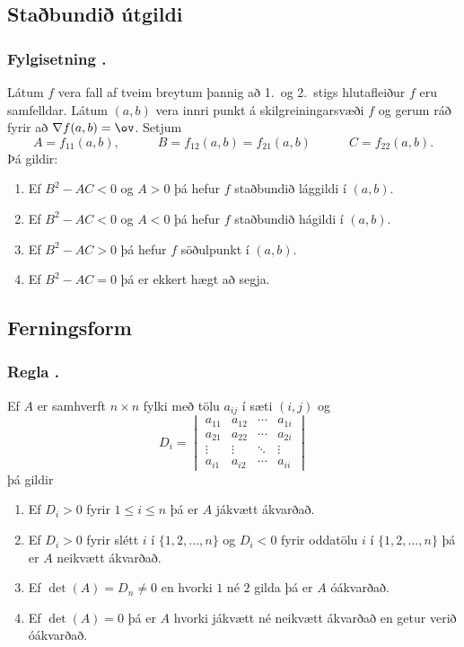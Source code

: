 

\subsection{Staðbundið útgildi}  

\subsubsection{Fylgisetning \kaflanr.}
Látum $f$ vera fall af tveim breytum þannig að
1.~og 2.~stigs hlutafleiður $f$ eru samfelldar.  Látum $(a,b)$ vera
innri punkt á skilgreiningarsvæði $f$ og gerum ráð fyrir að $\nabla
f(a,b)=\ov$.  Setjum 
$$A=f_{11}(a,b),\qquad\quad B=f_{12}(a,b)=f_{21}(a,b)\qquad\quad
C=f_{22}(a,b).$$ 
Þá gildir:
\begin {enumerate}
 \item  Ef $B^2-AC<0$ og $A>0$  þá hefur $f$
     staðbundið lággildi í $(a,b)$.
 \item  Ef $B^2-AC<0$ og $A<0$ 
 þá hefur $f$ staðbundið
hágildi í $(a,b)$.
 \item   Ef $B^2-AC>0$ 
þá hefur $f$ söðulpunkt í
      $(a,b)$.  
 \item  Ef $B^2-AC=0$ þá er ekkert hægt að segja.  
\end {enumerate}



 
\subsection{Ferningsform}  

\subsubsection{Regla \kaflanr.}
Ef $A$ er samhverft $n \times n$ fylki með tölu $a_{ij}$ í sæti $(i,j)$ og
\begin {equation*}
 D_i = \begin{vmatrix}
        a_{11} & a_{12} & \cdots & a_{1i} \\
        a_{21} & a_{22} & \cdots & a_{2i} \\
        \vdots & \vdots & \ddots & \vdots \\ 
        a_{i1} & a_{i2} & \cdots & a_{ii} 
       \end{vmatrix}
\end {equation*}
þá gildir
\begin {enumerate}
 \item Ef $D_i > 0$ fyrir $1\leq i \leq n$ þá er $A$ jákvætt ákvarðað.
 \item Ef $D_i > 0$ fyrir slétt $i$ í $\{1,2,\ldots,n\}$ og $D_i < 0$ fyrir oddatölu $i$ í $\{1,2,\ldots,n\}$ þá er $A$ neikvætt ákvarðað.
 \item Ef $\det(A) = D_n \neq 0$ en hvorki $1$ né $2$ gilda þá er $A$ óákvarðað. 
 \item Ef $\det(A) = 0$ þá er $A$ hvorki jákvætt né neikvætt ákvarðað en getur verið óákvarðað.
\end {enumerate}




